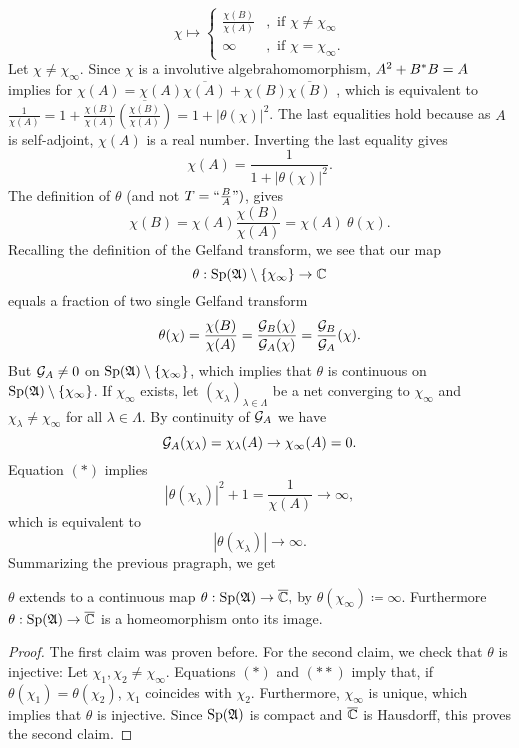  \[
 \chi \mapsto 
  \begin{cases}
    \frac{\chi(B)}{\chi(A)} &, \text{ if }\chi \neq \chi_\infty\\
    \infty &, \text{ if } \chi = \chi_\infty.
    \end{cases}
 \]
 Let $\chi \neq \chi_\infty$. Since $\chi$ is a involutive algebrahomomorphism,
 $A^2 + B^{*} B = A$ implies for
   $\chi(A) = \chi(A) \overline{\chi(A)} + \chi(B) \overline{\chi(B)} $
, which is equivalent to  
  $ \frac{1}{\chi(A)} = 1 + \frac{\chi(B)}{\chi(A)} 
  \overline{\left( \frac{\chi(B)}{\chi(A)} \right)} = 1 + | \theta(\chi)|^2$.
 The last equalities hold because as $A$ is self-adjoint, $\chi(A)$ is a real number.
 Inverting the last equality gives
\[
 \chi(A) = \frac{1}{1 + |\theta (\chi)|^2} \tag{$\ast$}.
\]
The definition of $\theta$ (and not  $T = 
`` \frac{B}{A} ")$, gives
\[
 \chi(B) = \chi(A) \frac{\chi(B)}{\chi(A)}= \chi(A)~ \theta(\chi) 
 \tag{$\ast \ast$}.
\]
Recalling the definition of the Gelfand transform, we see that our map
\[
 \theta : \operatorname{Sp}(\mathfrak{A}) \setminus \left\lbrace\chi_\infty\right\rbrace \to \mathbb{C}
\]
equals a fraction of two single Gelfand transform
\[
 \theta(\chi) = \frac{\chi(B)}{\chi(A)} = \frac{\mathcal{G}_B (\chi)}{\mathcal{G}_A (\chi)}=
 \frac{\mathcal{G}_B}{\mathcal{G}_A}(\chi).
\]
But $\mathcal{G}_A \neq 0$ on $\operatorname{Sp}(\mathfrak{A}) \setminus \left\lbrace\chi_\infty\right\rbrace$, which implies
that $\theta$ is continuous on $\operatorname{Sp}(\mathfrak{A}) \setminus \left\lbrace\chi_\infty\right\rbrace$.
If $\chi_\infty$ exists, let $ \left( \chi_\lambda \right) 
_{\lambda \in \Lambda}$ be a net converging to $\chi_\infty$ and 
$\chi_\lambda \neq \chi_\infty$ for all $\lambda \in \Lambda$. 
By continuity of $\mathcal{G}_A$ we have
\[
 \mathcal{G}_A (\chi_\lambda) = \chi_\lambda (A) \to \chi_\infty (A) = 0.
\]
Equation $(\ast)$ implies
\[
 | \theta( \chi_\lambda ) | ^2  + 1 = \frac{1}{\chi(A)} \to \infty,
\]
which is equivalent to 
\[
 | \theta (\chi_\lambda ) | \to \infty.
\]
Summarizing the previous pragraph, we get 
\begin{lem}
$\theta$ extends to a continuous map $ \theta : \operatorname{Sp}(\mathfrak{A}) \to {\overline{\mathbb{C}}},$
by $\theta (\chi_\infty) \coloneqq \infty$.
Furthermore $\theta : \operatorname{Sp} (\mathfrak{A}) \to {\overline{\mathbb{C}}}$ is a homeomorphism onto its image.
\end{lem}

\begin{proof}
The first claim was proven before. For the second claim, we check 
that $\theta$ is injective:
Let $\chi_1 , \chi_2 \neq \chi_\infty$. Equations $(\ast)$ and $(\ast \ast)$
imply that, if $\theta (\chi_1)= \theta( \chi_2)$, \newline $\chi_1$ coincides with
$\chi_2$. Furthermore, $\chi_\infty$ is unique, which implies that $\theta$
is injective. Since $\operatorname{Sp} (\mathfrak{A})$ is compact and ${\overline{\mathbb{C}}}$ is Hausdorff, 
this proves the second claim.
\end{proof}

